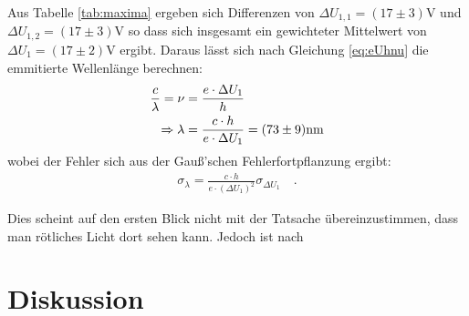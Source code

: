 \documentclass[12pt,a4paper,titlepage,headinclude,bibtotoc]{scrartcl}
\begin{document}
Aus Tabelle \ref{tab:maxima} ergeben sich Differenzen von $\Delta U_{1,1}=(17\pm 3)\si\volt$ und $\Delta U_{1,2}=(17 \pm 3)\si\volt$ so dass sich insgesamt ein gewichteter Mittelwert von $\Delta U_1=(17\pm 2)\si\volt$ ergibt.
Daraus lässt sich nach Gleichung \ref{eq:eUhnu} die emmitierte Wellenlänge berechnen:
\begin{align}
\frac{c}{\lambda}=\nu &= \frac{e\cdot\Delta U_1}{h}\notag\\
\Rightarrow \lambda&=\frac{c\cdot h}{e\cdot\Delta U_1}=(73\pm 9)\si{\nano\metre}
\end{align}
wobei der Fehler sich aus der Gauß'schen Fehlerfortpflanzung ergibt:
\begin{align}
\sigma_\lambda=\frac{c\cdot h}{e\cdot(\Delta U_1)^2}\sigma_{\Delta U_1}\quad .
\end{align}

Dies scheint auf den ersten Blick nicht mit der Tatsache übereinzustimmen, dass man rötliches Licht dort sehen kann.
Jedoch ist nach 

\section{Diskussion}
\label{sec:diskussion}



\end{document}

